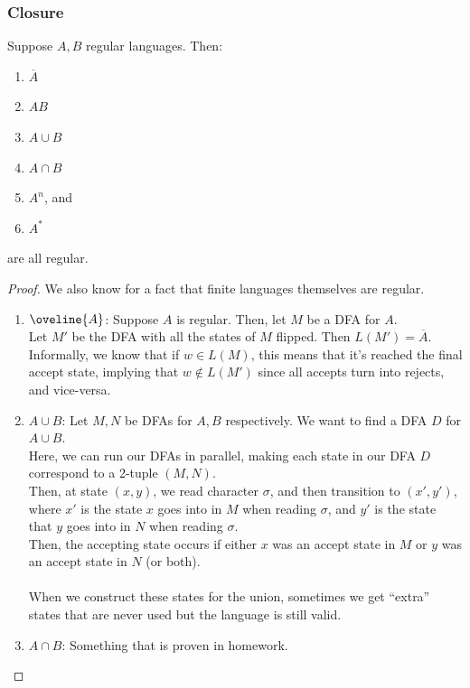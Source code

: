 \documentclass{article}
\begin{document}
    
    \subsubsection{Closure}
    Suppose $A, B$ regular languages. Then:
    \begin{enumerate}
        \item $\overline{A}$
        \item $AB$
        \item $A \cup B$
        \item $A \cap B$
        \item $A^n$, and
        \item $A^*$
    \end{enumerate}
    are all regular.
    \begin{proof}
    We also know for a fact that finite languages themselves are regular.
    \begin{enumerate}
        \item $\oveline{A}$: Suppose $A$ is regular. Then, let $M$ be a DFA for $A$.\\
        Let $M'$ be the DFA with all the states of $M$ flipped. Then $L(M') = \overline{A}$.\\
        Informally, we know that if $w \in L(M)$, this means that it's reached the final accept state, implying that $w \not\in L(M')$ since all accepts turn into rejects, and vice-versa.
        
        \item $A \cup B$: Let $M, N$ be DFAs for $A,B$ respectively. We want to find a DFA $D$ for $A \cup B$.\\
        Here, we can run our DFAs in parallel, making each state in our DFA $D$ correspond to a 2-tuple $(M, N)$.\\
        Then, at state $(x,y)$, we read character $\sigma$, and then transition to $(x', y')$, where $x'$ is the state $x$ goes into in $M$ when reading $\sigma$, and $y'$ is the state that $y$ goes into in $N$ when reading $\sigma$.\\
        Then, the accepting state occurs if either $x$ was an accept state in $M$ or $y$ was an accept state in $N$ (or both).\\
        \\
        When we construct these states for the union, sometimes we get ``extra'' states that are never used but the language is still valid.
         
         \item $A \cap B$: Something that is proven in homework.
         

\end{enumerate}
\end{proof}
\end{document}
